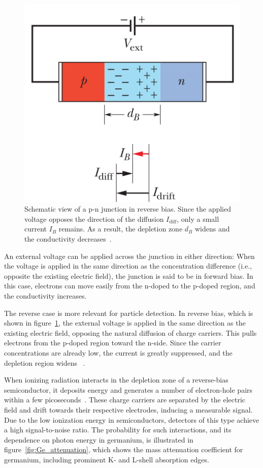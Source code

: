 \begin{figure}[t]
    \centering
    \includegraphics[width=0.5\linewidth]{figures/03_legend/PN_junction.png}
    \caption{Schematic view of a p-n junction in reverse bias. Since the applied voltage opposes the direction of the diffusion $I_{\text{diff}}$, only a small current $I_B$ remains. As a result, the depletion zone $d_B$ widens and the conductivity decreases~\cite{walker_fundamentals_2014}.}
\label{fig:pn_junction}
\end{figure}

 
An external voltage can be applied across the junction in either direction: 
When the voltage is applied in the same direction as the concentration difference (i.e., opposite the existing electric field), the junction is said to be in forward bias. In this case, electrons can move easily from the n-doped to the p-doped region, and the conductivity increases. 

The reverse case is more relevant for particle detection. In reverse bias, which is shown in figure~\ref{fig:pn_junction}, the external voltage is applied in the same direction as the existing electric field, opposing the natural diffusion of charge carriers. This pulls electrons from the p-doped region toward the n-side. Since the carrier concentrations are already low, the current is greatly suppressed, and the depletion region widens ~\cite{hofmann_solid_2015, knoll_radiation_2000, simon_oxford_2017}.

When ionizing radiation interacts in the depletion zone of a reverse-bias semiconductor, it deposits energy and generates a number of electron-hole pairs within a few picoseconds~\cite{agostini_pulse_2022}. 
These charge carriers are separated by the electric field and drift towards their respective electrodes, inducing a measurable signal. Due to the low ionization energy in semiconductors, detectors of this type achieve a high signal-to-noise ratio. 
The probability for such interactions, and its dependence on photon energy in germanium, is illustrated in figure~\ref{fig:Ge_attenuation}, which shows the mass attenuation coefficient for germanium, including prominent K- and L-shell absorption edges. 

